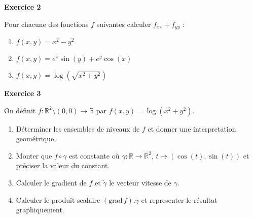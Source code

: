 \documentclass[a4paper,12pt]{article}
\begin{document}



\hrulefill

\vspace{1cm}

\begin{center}
{\large{\bf Exercice 2}}
\end{center}

Pour chacune des fonctions $f$ suivantes calculer $f_{xx} + f_{yy}$
: 

\begin{enumerate}
	\item $f(x,y)=  x^2 - y^2$
	\item $f(x,y) = e^x \sin(y) + e^y \cos(x)$
	\item $f(x,y)=  \log(\sqrt{ x^2 + y^2})$
	
\end{enumerate}

\hrulefill



\vspace{1cm}

\begin{center}
{\large{\bf Exercice 3}}
\end{center}


On définit $f:\mathbb{R}^2 \setminus (0,0)\rightarrow	\mathbb{R}$ par $f(x,y) = \log(x^2 +
y^2)$.

\begin{enumerate}
	\item Déterminer les ensembles de niveaux de $f$ et
		donner une interpretation geométrique.
	\item Monter que $f\circ \gamma$ est constante o\`u
		$\gamma: \mathbb{R} \rightarrow
		\mathbb{R}^2
		,\, t \mapsto (\cos(t),\sin(t))$ et préciser
		la valeur du constant.

	\item  Calculer le gradient de $f$ et $\dot{\gamma}$ le vecteur
		vitesse de $\gamma$. 
	\item Calculer le produit scalaire 
		$(\mathrm{grad}\,f).\dot{\gamma}$ et representer le résultat
		graphiquement.
	
\end{enumerate}
 
\end{document}
